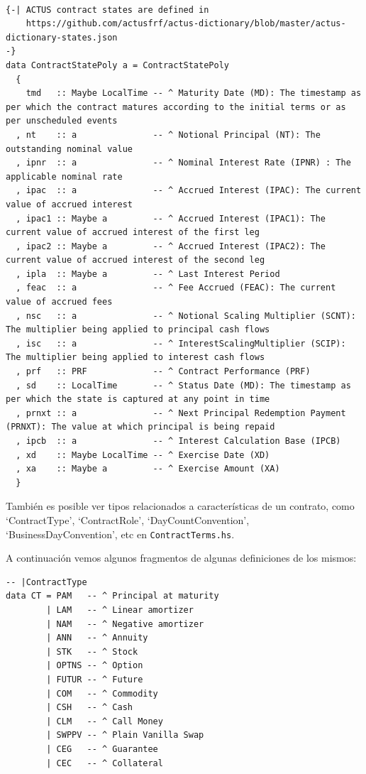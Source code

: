 \documentclass[12pt]{book}
\begin{document}
\begin{lstlisting}[style=Haskell-cardano, caption=Contract state poly]

{-| ACTUS contract states are defined in
    https://github.com/actusfrf/actus-dictionary/blob/master/actus-dictionary-states.json
-}
data ContractStatePoly a = ContractStatePoly
  {
    tmd   :: Maybe LocalTime -- ^ Maturity Date (MD): The timestamp as per which the contract matures according to the initial terms or as per unscheduled events
  , nt    :: a               -- ^ Notional Principal (NT): The outstanding nominal value
  , ipnr  :: a               -- ^ Nominal Interest Rate (IPNR) : The applicable nominal rate
  , ipac  :: a               -- ^ Accrued Interest (IPAC): The current value of accrued interest
  , ipac1 :: Maybe a         -- ^ Accrued Interest (IPAC1): The current value of accrued interest of the first leg
  , ipac2 :: Maybe a         -- ^ Accrued Interest (IPAC2): The current value of accrued interest of the second leg
  , ipla  :: Maybe a         -- ^ Last Interest Period
  , feac  :: a               -- ^ Fee Accrued (FEAC): The current value of accrued fees
  , nsc   :: a               -- ^ Notional Scaling Multiplier (SCNT): The multiplier being applied to principal cash flows
  , isc   :: a               -- ^ InterestScalingMultiplier (SCIP): The multiplier being applied to interest cash flows
  , prf   :: PRF             -- ^ Contract Performance (PRF)
  , sd    :: LocalTime       -- ^ Status Date (MD): The timestamp as per which the state is captured at any point in time
  , prnxt :: a               -- ^ Next Principal Redemption Payment (PRNXT): The value at which principal is being repaid
  , ipcb  :: a               -- ^ Interest Calculation Base (IPCB)
  , xd    :: Maybe LocalTime -- ^ Exercise Date (XD)
  , xa    :: Maybe a         -- ^ Exercise Amount (XA)
  }
\end{lstlisting}


También es posible ver tipos relacionados a características de un contrato, como `ContractType', `ContractRole', `DayCountConvention', `BusinessDayConvention', etc en \texttt{ContractTerms.hs}.

A continuación vemos algunos fragmentos de algunas definiciones de los mismos:

\begin{lstlisting}[style=Haskell-cardano, caption=Tipos de contrato]
-- |ContractType
data CT = PAM   -- ^ Principal at maturity
        | LAM   -- ^ Linear amortizer
        | NAM   -- ^ Negative amortizer
        | ANN   -- ^ Annuity
        | STK   -- ^ Stock
        | OPTNS -- ^ Option
        | FUTUR -- ^ Future
        | COM   -- ^ Commodity
        | CSH   -- ^ Cash
        | CLM   -- ^ Call Money
        | SWPPV -- ^ Plain Vanilla Swap
        | CEG   -- ^ Guarantee
        | CEC   -- ^ Collateral
\end{lstlisting}
\end{document}
